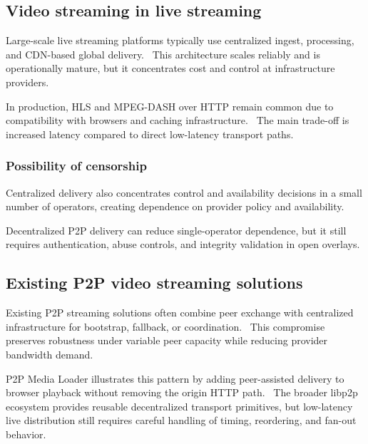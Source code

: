 \subsection{Video streaming in live streaming}
Large-scale live streaming platforms typically use centralized ingest, processing, and \ac{CDN}-based global delivery.~\cite{peroniEndtoEndPipelinePerspective2025,huangLiveStreamingIts2023a} This architecture scales reliably and is operationally mature, but it concentrates cost and control at infrastructure providers.~\cite{huangLiveStreamingIts2023a}

In production, HLS and MPEG-DASH over HTTP remain common due to compatibility with browsers and caching infrastructure.~\cite{pantos_http_2017,noauthor_standards_nodate} The main trade-off is increased latency compared to direct low-latency transport paths.~\cite{peroniEndtoEndPipelinePerspective2025,noauthor_webrtc_nodate}
\subsubsection{Possibility of censorship}
Centralized delivery also concentrates control and availability decisions in a small number of operators, creating dependence on provider policy and availability.~\cite{huangLiveStreamingIts2023a,ServiceHealthNov}

Decentralized \ac{P2P} delivery can reduce single-operator dependence, but it still requires authentication, abuse controls, and integrity validation in open overlays.~\cite{SecurityConsiderations}
\subsection{Existing \ac{P2P} video streaming solutions}
Existing \ac{P2P} streaming solutions often combine peer exchange with centralized infrastructure for bootstrap, fallback, or coordination.~\cite{xuAnalysisCDNP2P2006,meskovicContentDeliveryArchitectures2012} This compromise preserves robustness under variable peer capacity while reducing provider bandwidth demand.~\cite{xuAnalysisCDNP2P2006,meskovicContentDeliveryArchitectures2012}

\ac{P2P} Media Loader illustrates this pattern by adding peer-assisted delivery to browser playback without removing the origin HTTP path.~\cite{NovageP2pmedialoader2025} The broader libp2p ecosystem provides reusable decentralized transport primitives, but low-latency live distribution still requires careful handling of timing, reordering, and fan-out behavior.~\cite{Libp2pIPFSDocs,SecurityConsiderations}

